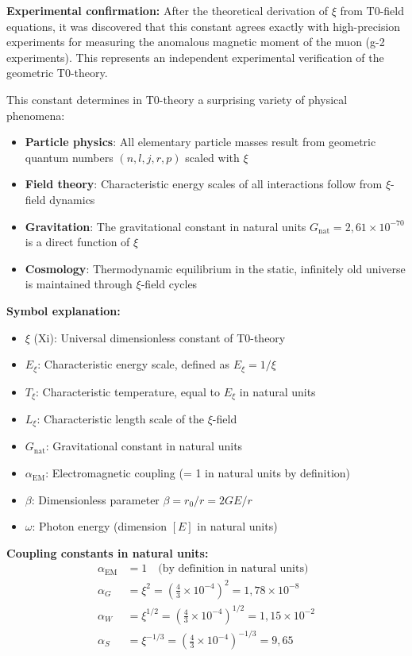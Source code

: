 \documentclass[12pt,a4paper]{article}
\begin{document}
	\textbf{Experimental confirmation:} After the theoretical derivation of $\xi$ from T0-field equations, it was discovered that this constant agrees exactly with high-precision experiments for measuring the anomalous magnetic moment of the muon (g-2 experiments). This represents an independent experimental verification of the geometric T0-theory.
	
	This constant determines in T0-theory a surprising variety of physical phenomena:
	\begin{itemize}
		\item \textbf{Particle physics}: All elementary particle masses result from geometric quantum numbers $(n,l,j,r,p)$ scaled with $\xi$
		\item \textbf{Field theory}: Characteristic energy scales of all interactions follow from $\xi$-field dynamics
		\item \textbf{Gravitation}: The gravitational constant in natural units $G_{\text{nat}} = 2{,}61 \times 10^{-70}$ is a direct function of $\xi$
		\item \textbf{Cosmology}: Thermodynamic equilibrium in the static, infinitely old universe is maintained through $\xi$-field cycles
	\end{itemize}
	
	\textbf{Symbol explanation:}
	\begin{itemize}
		\item $\xi$ (Xi): Universal dimensionless constant of T0-theory
		\item $E_\xi$: Characteristic energy scale, defined as $E_\xi = 1/\xi$
		\item $T_\xi$: Characteristic temperature, equal to $E_\xi$ in natural units
		\item $L_\xi$: Characteristic length scale of the $\xi$-field
		\item $G_{\text{nat}}$: Gravitational constant in natural units
		\item $\alpha_{\text{EM}}$: Electromagnetic coupling (= 1 in natural units by definition)
		\item $\beta$: Dimensionless parameter $\beta = r_0/r = 2GE/r$
		\item $\omega$: Photon energy (dimension $[E]$ in natural units)
	\end{itemize}
	
	\textbf{Coupling constants in natural units:}
	\begin{align}
		\alpha_{\text{EM}} &= 1 \quad \text{(by definition in natural units)} \\
		\alpha_G &= \xi^2 = \left(\frac{4}{3} \times 10^{-4}\right)^2 = 1{,}78 \times 10^{-8} \\
		\alpha_W &= \xi^{1/2} = \left(\frac{4}{3} \times 10^{-4}\right)^{1/2} = 1{,}15 \times 10^{-2} \\
		\alpha_S &= \xi^{-1/3} = \left(\frac{4}{3} \times 10^{-4}\right)^{-1/3} = 9{,}65
	\end{align}
	
\end{document}

